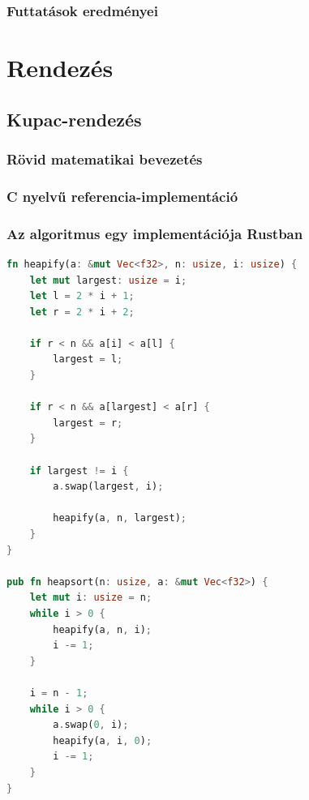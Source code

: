 \subsubsection{Futtatások eredményei}

\section{Rendezés}

\subsection{Kupac-rendezés}
\subsubsection{Rövid matematikai bevezetés}
\subsubsection{C nyelvű referencia-implementáció}
\subsubsection{Az algoritmus egy implementációja Rustban}
\begin{lstlisting}[language=Rust]
fn heapify(a: &mut Vec<f32>, n: usize, i: usize) {
	let mut largest: usize = i;
	let l = 2 * i + 1;
	let r = 2 * i + 2;
	
	if r < n && a[i] < a[l] {
		largest = l;
	}
	
	if r < n && a[largest] < a[r] {
		largest = r;
	}
	
	if largest != i {
		a.swap(largest, i);
		
		heapify(a, n, largest);
	}
}

pub fn heapsort(n: usize, a: &mut Vec<f32>) {
	let mut i: usize = n;
	while i > 0 {
		heapify(a, n, i);
		i -= 1;
	}

	i = n - 1;
	while i > 0 {
		a.swap(0, i);
		heapify(a, i, 0);
		i -= 1;
	}
}
\end{lstlisting}
